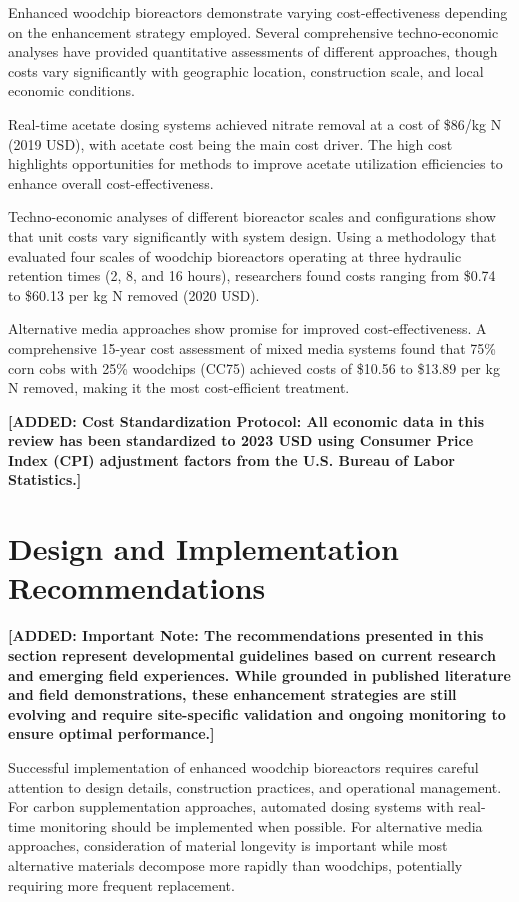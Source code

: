 \documentclass[12pt,a4paper]{article}
\newcommand{\added}[1]{\textcolor{addedtext}{\textbf{[ADDED: #1]}}}
\begin{document}
Enhanced woodchip bioreactors demonstrate varying cost-effectiveness depending on the enhancement strategy employed. Several comprehensive techno-economic analyses have provided quantitative assessments of different approaches, though costs vary significantly with geographic location, construction scale, and local economic conditions.

Real-time acetate dosing systems achieved nitrate removal at a cost of \$86/kg N (2019 USD), with acetate cost being the main cost driver. The high cost highlights opportunities for methods to improve acetate utilization efficiencies to enhance overall cost-effectiveness.

Techno-economic analyses of different bioreactor scales and configurations show that unit costs vary significantly with system design. Using a methodology that evaluated four scales of woodchip bioreactors operating at three hydraulic retention times (2, 8, and 16 hours), researchers found costs ranging from \$0.74 to \$60.13 per kg N removed (2020 USD).

Alternative media approaches show promise for improved cost-effectiveness. A comprehensive 15-year cost assessment of mixed media systems found that 75\% corn cobs with 25\% woodchips (CC75) achieved costs of \$10.56 to \$13.89 per kg N removed, making it the most cost-efficient treatment.

\added{Cost Standardization Protocol: All economic data in this review has been standardized to 2023 USD using Consumer Price Index (CPI) adjustment factors from the U.S. Bureau of Labor Statistics.}

\section{Design and Implementation Recommendations}

\added{Important Note: The recommendations presented in this section represent developmental guidelines based on current research and emerging field experiences. While grounded in published literature and field demonstrations, these enhancement strategies are still evolving and require site-specific validation and ongoing monitoring to ensure optimal performance.}

Successful implementation of enhanced woodchip bioreactors requires careful attention to design details, construction practices, and operational management. For carbon supplementation approaches, automated dosing systems with real-time monitoring should be implemented when possible. For alternative media approaches, consideration of material longevity is important while most alternative materials decompose more rapidly than woodchips, potentially requiring more frequent replacement.
\end{document}
